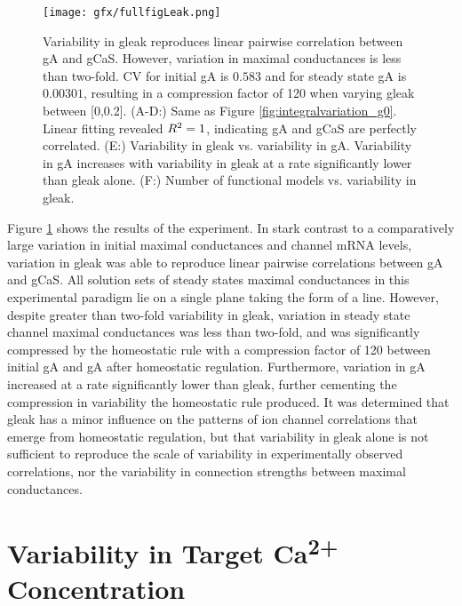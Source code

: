 \begin{figure}[H]
    \centering
    \begin{addmargin}[-2cm]{-3cm}
    \texttt{[image: gfx/fullfigLeak.png]}
    \end{addmargin}
\caption[Variability in \ac{gleak} under integral control.]{Variability in \ac{gleak} reproduces linear pairwise correlation between \ac{gA} and \ac{gCaS}. However, variation in maximal conductances is less than two-fold. CV for initial \ac{gA} is $0.583$ and for steady state \ac{gA} is $0.00301$, resulting in a compression factor of 120 when varying \ac{gleak} between [0,0.2]. (\textsc{A-D:}) Same as Figure \ref{fig:integralvariation_g0}. Linear fitting revealed \(R\textsuperscript{2} = 1\), indicating \ac{gA} and \ac{gCaS} are perfectly correlated. (\textsc{E:}) Variability in \ac{gleak} vs. variability in \ac{gA}. Variability in \ac{gA} increases with variability in \ac{gleak} at a rate significantly lower than \ac{gleak} alone. (\textsc{F:}) Number of functional models vs. variability in \ac{gleak}.}
    \label{fig:integralvariation_Leak}
\end{figure}

Figure \ref{fig:integralvariation_Leak} shows the results of the experiment. In stark contrast to a comparatively large variation in initial maximal conductances and channel mRNA levels, variation in \ac{gleak} was able to reproduce linear pairwise correlations between \ac{gA} and \ac{gCaS}. All solution sets of steady states maximal conductances in this experimental paradigm lie on a single plane taking the form of a line. However, despite greater than two-fold variability in \ac{gleak}, variation in steady state channel maximal conductances was less than two-fold, and was significantly compressed by the homeostatic rule with a compression factor of 120 between initial \ac{gA} and \ac{gA} after homeostatic regulation. Furthermore, variation in \ac{gA} increased at a rate significantly lower than \ac{gleak}, further cementing the compression in variability the homeostatic rule produced. It was determined that \ac{gleak} has a minor influence on the patterns of ion channel correlations that emerge from homeostatic regulation, but that variability in \ac{gleak} alone is not sufficient to reproduce the scale of variability in experimentally observed correlations, nor the variability in connection strengths between maximal conductances.

\section{Variability in Target Ca\textsuperscript{2+} Concentration}

